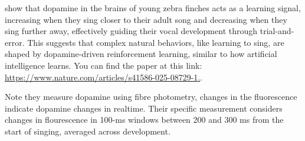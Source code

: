 \documentclass{article}\usepackage[]{graphicx}\usepackage[]{xcolor}
\begin{document}
\cite{Kasdin25} show that dopamine in the brains of young zebra finches acts as 
a learning signal, increasing when they sing closer to their adult song and 
decreasing when they sing further away, effectively guiding their vocal 
development through trial-and-error. This suggests that complex natural 
behaviors, like learning to sing, are shaped by dopamine-driven reinforcement 
learning, similar to how artificial intelligence learns. You can find the 
paper at this link:
\href{https://www.nature.com/articles/s41586-025-08729-1}{{https://www.nature.com/articles/s41586-025-08729-1}.}.

Note they measure dopamine using fibre photometry, changes in the fluorescence
indicate dopamine changes in realtime. Their specific measurement considers 
changes in flourescence in 100-ms windows between 200 and 300 ms from the start 
of singing, averaged across development.
\end{document}
